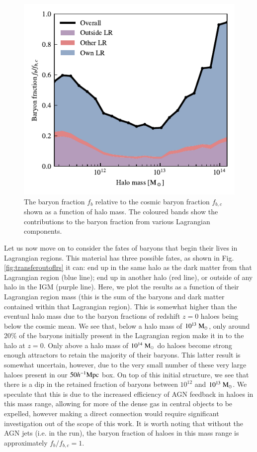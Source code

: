 \begin{figure}
	\centering
	\includegraphics{figures/s50j7kAHF/baryon_fraction_breakdown.pdf}
	\vspace{-0.7cm}
	\caption{The baryon fraction $f_b$ relative to the cosmic baryon fraction
	$f_{b, c}$ shown as a function of halo mass. The coloured bands show the
	contributions to the baryon fraction from various Lagrangian components.}
	\label{fig:baryonfraction}
\end{figure}

Let us now move on to consider the fates of baryons that begin their lives in
Lagrangian regions. This material has three possible fates, as shown in Fig.
\ref{fig:transferoutoflrs} it can: end up in the same halo as the dark matter
from that Lagrangian region (blue line); end up in another halo (red line),
or outside of any halo in the IGM (purple line). Here, we plot the results as
a function of their Lagrangian region mass (this is the sum of the baryons
and dark matter contained within that Lagrangian region). This is somewhat
higher than the eventual halo mass due to the baryon fractions of redshift
$z=0$ haloes being below the cosmic mean. We see that, below a halo mass of
$10^{13}\;{\rm M}_{\odot}{}$, only around 20\% of the baryons initially present in the
Lagrangian region make it in to the halo at $z=0$. Only above a halo mass of
$10^{14}\;{\rm M}_{\odot}{}$ do haloes become strong enough attractors to retain the
majority of their baryons. This latter result is somewhat uncertain, however,
due to the very small number of these very large haloes present in our
$50h^{-1}{\rm Mpc}{}$ box. On top of this initial structure, we see that there is a dip
in the retained fraction of baryons between $10^{12}$ and $10^{13}\;{\rm M}_{\odot}{}$.
We speculate that this is due to the increased efficiency of AGN feedback in
haloes in this mass range, allowing for more of the dense gas in central
objects to be expelled, however making a direct connection would require 
significant investigation out of the scope of this work. It is worth noting that
without the AGN jets (i.e. in the \nojet{} run), the baryon fraction of haloes
in this mass range is approximately $f_b / f_{b,c} = 1$.

